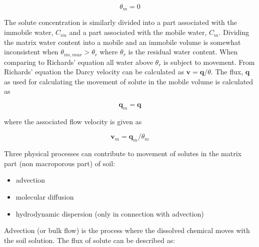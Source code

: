 \documentclass{report}
\begin{document}
\begin{equation}
\theta_{m}= 0
\end{equation}


The solute concentration is similarly divided into a part associated
with the immobile water, $C_{im}$ and a part associated with the
mobile water, $C_{m}$. Dividing the matrix water content into a
mobile and an immobile volume is somewhat inconsistent when
$\theta_{im,max}>\theta_r$ where $\theta_r$ is the residual water
content. When comparing to Richards' equation all water above
$\theta_r$ is subject to movement. From Richards' equation the Darcy
velocity can be calculated as $\mathbf{v}=\mathbf{q}/\theta$. The
flux, $\mathbf{q}$ as used for calculating the movement of solute in
the mobile volume is calculated as



\begin{equation}
\mathbf{q}_{m} = \mathbf{q}
\end{equation}

%
where the associated flow velocity is given as

\begin{equation}
\mathbf{v}_{m}=\mathbf{q}_{m}/\theta_{m}
\end{equation}

Three physical processes can contribute to movement of solutes in
the matrix part (non macroporous part) of soil:

\begin{itemize}
\item advection
\item molecular diffusion
\item hydrodynamic dispersion (only in connection
  with advection)
\end{itemize}

Advection (or bulk flow) is the
process where the dissolved chemical moves with the soil solution.
The flux of solute can be described as:
\end{document}
